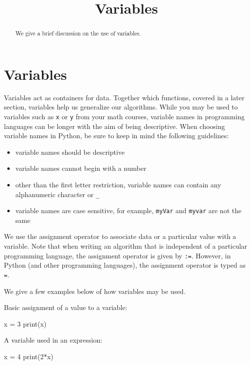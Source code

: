 \documentclass{ximera}
\title{Variables}
\begin{document}
  
\begin{abstract}  
We give a brief discussion on the use of variables.
\end{abstract}  
\maketitle

\section{Variables}

Variables act as containers for data. Together which functions, covered in a later section, variables help us generalize our algorithms. While you may be used to variables such as \verb|x| or \verb|y| from your math courses, variable names in programming languages can be longer with the aim of being descriptive. When choosing variable names in Python, be sure to keep in mind the following guidelines:

\begin{itemize}
	\item variable names should be descriptive
	\item variable names cannot begin with a number
	\item other than the first letter restriction, variable names can contain any alphanumeric character or \verb|_|
	\item variable names are case sensitive, for example, \verb|myVar| and \verb|myvar| are not the same
\end{itemize}

We use the assignment operator to associate data or a particular value with a variable. Note that when writing an algorithm that is independent of a particular programming language, the assignment operator is given by \verb|:=|. However, in Python (and other programming languages), the assignment operator is typed as \verb|=|.

We give a few examples below of how variables may be used.

Basic assignment of a value to a variable:

\begin{sageCell}
x = 3
print(x)
\end{sageCell}

A variable used in an expression:

\begin{sageCell}
x = 4
print(2*x)
\end{sageCell}
\end{document}
